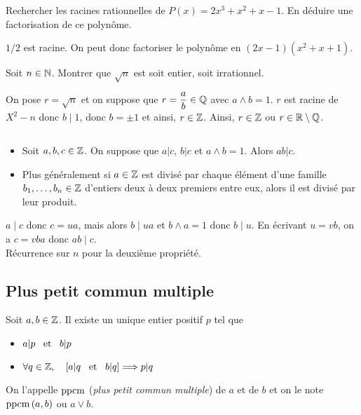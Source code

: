 \documentclass{magnolia}
\begin{document}
\begin{exos}
\exo Rechercher les racines rationnelles de $P(x)=2x^3+x^2+x-1$. En déduire
  une factorisation de ce polynôme.
  \begin{sol}
  $1/2$ est racine. On peut donc factoriser le polynôme en
  $(2x-1)(x^2+x+1)$.    
  \end{sol}
\exo Soit $n\in\mathbb{N}$. Montrer que $\sqrt{n}$ est soit  entier, soit
  irrationnel.
  \begin{sol}
  On pose $r=\sqrt{n}$ et on suppose que $r=\dfrac{a}{b}\in \mathbb{Q}$ avec $a\wedge b=1$. $r$ est racine de $X^2-n$ donc $b\mid 1$, donc $b=\pm 1$ et ainsi, $r\in \mathbb{Z}$. Ainsi, $r\in \mathbb{Z}$ ou $r\in \mathbb{R}\setminus\mathbb{Q}$.
  \end{sol} 
\end{exos}


\begin{proposition}
$\quad$
\begin{itemize}
\item Soit $a,b,c\in\mathbb{Z}$. On suppose que $a|c$, $b|c$ et $a\wedge b=1$.
  Alors $ab|c$.
\item Plus généralement si $a\in\mathbb{Z}$ est divisé par chaque élément d'une famille
  $b_1,\ldots,b_n\in\mathbb{Z}$ d'entiers deux à deux premiers entre eux, alors il
  est divisé par leur produit.
\end{itemize}
\end{proposition}

\begin{preuve}
$a\mid c$ donc $c=ua$, mais alors $b\mid ua$ et $b\wedge a=1$ donc $b\mid u$. En écrivant $u=vb$, on a $c=vba$ donc $ab\mid c$.\\
Récurrence sur $n$ pour la deuxième propriété.
\end{preuve}

\subsection{Plus petit commun multiple}

\begin{definition}
Soit $a,b\in\mathbb{Z}$. Il existe un unique entier positif $p$ tel que
\begin{itemize}
\item $a|p \quad\!\text{et}\quad\! b|p$
\item $\forall q\in\mathbb{Z} ,\quad \left[a|q \quad\!\text{et}\quad\! b|q\right] \Longrightarrow p|q$
\end{itemize}
On l'appelle $\operatorname{ppcm}$ (\emph{plus petit commun multiple}) de $a$ et de $b$ et on le note
$\operatorname{ppcm}\left(a,b\right)$ ou $a\vee b$.
\end{definition}
\end{document}
